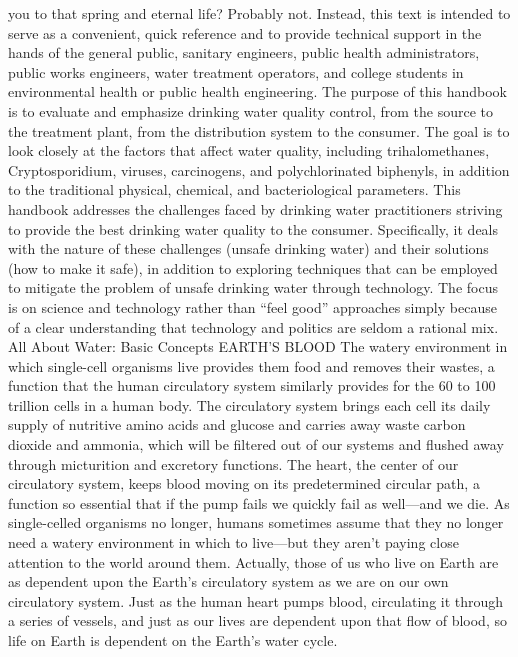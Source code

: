 \documentclass{article}
\begin{document}
you to that spring and eternal life? Probably not. Instead, this text is
intended to serve as a convenient, quick reference and to provide
technical support in the hands of the general public, sanitary
engineers, public health administrators, public works engineers, water
treatment operators, and college students in environmental health or
public health engineering. The purpose of this handbook is to evaluate
and emphasize drinking water quality control, from the source to the
treatment plant, from the distribution system to the consumer. The goal
is to look closely at the factors that affect water quality, including
trihalomethanes, Cryptosporidium, viruses, carcinogens, and
polychlorinated biphenyls, in addition to the traditional physical,
chemical, and bacteriological parameters. This handbook addresses the
challenges faced by drinking water practitioners striving to provide the
best drinking water quality to the consumer. Specifically, it deals with
the nature of these challenges (unsafe drinking water) and their
solutions (how to make it safe), in addition to exploring techniques
that can be employed to mitigate the problem of unsafe drinking water
through technology. The focus is on science and technology rather than
``feel good'' approaches simply because of a clear understanding that
technology and politics are seldom a rational mix. All About Water:
Basic Concepts EARTH'S BLOOD The watery environment in which single-cell
organisms live provides them food and removes their wastes, a function
that the human circulatory system similarly provides for the 60 to 100
trillion cells in a human body. The circulatory system brings each cell
its daily supply of nutritive amino acids and glucose and carries away
waste carbon dioxide and ammonia, which will be filtered out of our
systems and flushed away through micturition and excretory functions.
The heart, the center of our circulatory system, keeps blood moving on
its predetermined circular path, a function so essential that if the
pump fails we quickly fail as well---and we die. As single-celled
organisms no longer, humans sometimes assume that they no longer need a
watery environment in which to live---but they aren't paying close
attention to the world around them. Actually, those of us who live on
Earth are as dependent upon the Earth's circulatory system as we are on
our own circulatory system. Just as the human heart pumps blood,
circulating it through a series of vessels, and just as our lives are
dependent upon that flow of blood, so life on Earth is dependent on the
Earth's water cycle.
\end{document}
